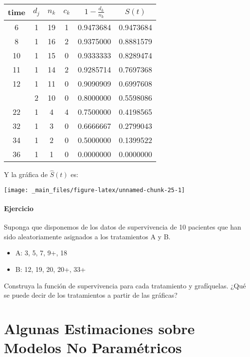 \documentclass[
  a4paper,
  oneside,
  openany]{book}
\providecommand{\tightlist}{%
  \setlength{\itemsep}{0pt}\setlength{\parskip}{0pt}}
\begin{document}
\begin{table}
\centering
\begin{tabular}{cccccc}
\toprule
time & $d_j$ & $n_k$ & $c_k$ & $1-\frac{d_k}{n_k}$ & $S(t)$\\
\midrule
6 & 1 & 19 & 1 & 0.9473684 & 0.9473684\\
8 & 1 & 16 & 2 & 0.9375000 & 0.8881579\\
10 & 1 & 15 & 0 & 0.9333333 & 0.8289474\\
11 & 1 & 14 & 2 & 0.9285714 & 0.7697368\\
12 & 1 & 11 & 0 & 0.9090909 & 0.6997608\\
\addlinespace
13 & 2 & 10 & 0 & 0.8000000 & 0.5598086\\
22 & 1 & 4 & 4 & 0.7500000 & 0.4198565\\
32 & 1 & 3 & 0 & 0.6666667 & 0.2799043\\
34 & 1 & 2 & 0 & 0.5000000 & 0.1399522\\
36 & 1 & 1 & 0 & 0.0000000 & 0.0000000\\
\bottomrule
\end{tabular}
\end{table}

Y la gráfica de \(\hat S(t)\) es:

\begin{center}\texttt{[image: \_main\_files/figure-latex/unnamed-chunk-25-1]} \end{center}

\hypertarget{ejercicio}{%
\subsubsection*{Ejercicio}\label{ejercicio}}


Suponga que disponemos de los datos de supervivencia de 10 pacientes que han sido aleatoriamente asignados a los tratamientos A y B.

\begin{itemize}
\tightlist
\item
  A: 3, 5, 7, 9+, 18
\item
  B: 12, 19, 20, 20+, 33+
\end{itemize}

Construya la función de supervivencia para cada tratamiento y grafíquelas. ¿Qué se puede decir de los tratamientos a partir de las gráficas?

\hypertarget{algunas-estimaciones-sobre-modelos-no-paramuxe9tricos}{%
\chapter{Algunas Estimaciones sobre Modelos No Paramétricos}\label{algunas-estimaciones-sobre-modelos-no-paramuxe9tricos}}
\end{document}
